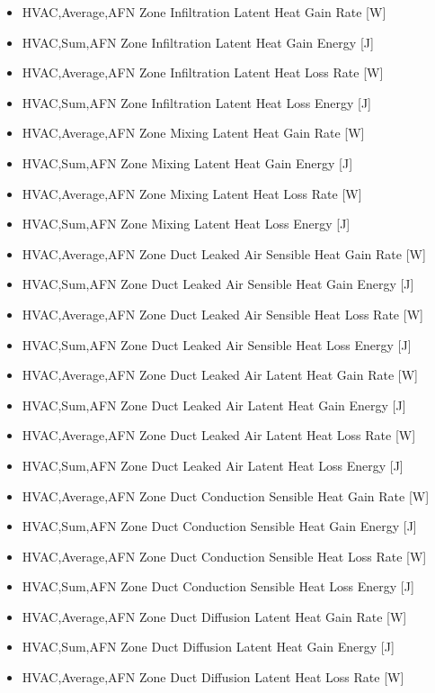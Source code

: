 \begin{itemize}
\item
  HVAC,Average,AFN Zone Infiltration Latent Heat Gain Rate {[}W{]}
\item
  HVAC,Sum,AFN Zone Infiltration Latent Heat Gain Energy {[}J{]}
\item
  HVAC,Average,AFN Zone Infiltration Latent Heat Loss Rate {[}W{]}
\item
  HVAC,Sum,AFN Zone Infiltration Latent Heat Loss Energy {[}J{]}
\item
  HVAC,Average,AFN Zone Mixing Latent Heat Gain Rate {[}W{]}
\item
  HVAC,Sum,AFN Zone Mixing Latent Heat Gain Energy {[}J{]}
\item
  HVAC,Average,AFN Zone Mixing Latent Heat Loss Rate {[}W{]}
\item
  HVAC,Sum,AFN Zone Mixing Latent Heat Loss Energy {[}J{]}
\item
  HVAC,Average,AFN Zone Duct Leaked Air Sensible Heat Gain Rate {[}W{]}
\item
  HVAC,Sum,AFN Zone Duct Leaked Air Sensible Heat Gain Energy {[}J{]}
\item
  HVAC,Average,AFN Zone Duct Leaked Air Sensible Heat Loss Rate {[}W{]}
\item
  HVAC,Sum,AFN Zone Duct Leaked Air Sensible Heat Loss Energy {[}J{]}
\item
  HVAC,Average,AFN Zone Duct Leaked Air Latent Heat Gain Rate {[}W{]}
\item
  HVAC,Sum,AFN Zone Duct Leaked Air Latent Heat Gain Energy {[}J{]}
\item
  HVAC,Average,AFN Zone Duct Leaked Air Latent Heat Loss Rate {[}W{]}
\item
  HVAC,Sum,AFN Zone Duct Leaked Air Latent Heat Loss Energy {[}J{]}
\item
  HVAC,Average,AFN Zone Duct Conduction Sensible Heat Gain Rate {[}W{]}
\item
  HVAC,Sum,AFN Zone Duct Conduction Sensible Heat Gain Energy {[}J{]}
\item
  HVAC,Average,AFN Zone Duct Conduction Sensible Heat Loss Rate {[}W{]}
\item
  HVAC,Sum,AFN Zone Duct Conduction Sensible Heat Loss Energy {[}J{]}
\item
  HVAC,Average,AFN Zone Duct Diffusion Latent Heat Gain Rate {[}W{]}
\item
  HVAC,Sum,AFN Zone Duct Diffusion Latent Heat Gain Energy {[}J{]}
\item
  HVAC,Average,AFN Zone Duct Diffusion Latent Heat Loss Rate {[}W{]}

\end{itemize}
